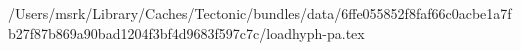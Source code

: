 /Users/msrk/Library/Caches/Tectonic/bundles/data/6ffe055852f8faf66c0acbe1a7fb27f87b869a90bad1204f3bf4d9683f597c7c/loadhyph-pa.tex
